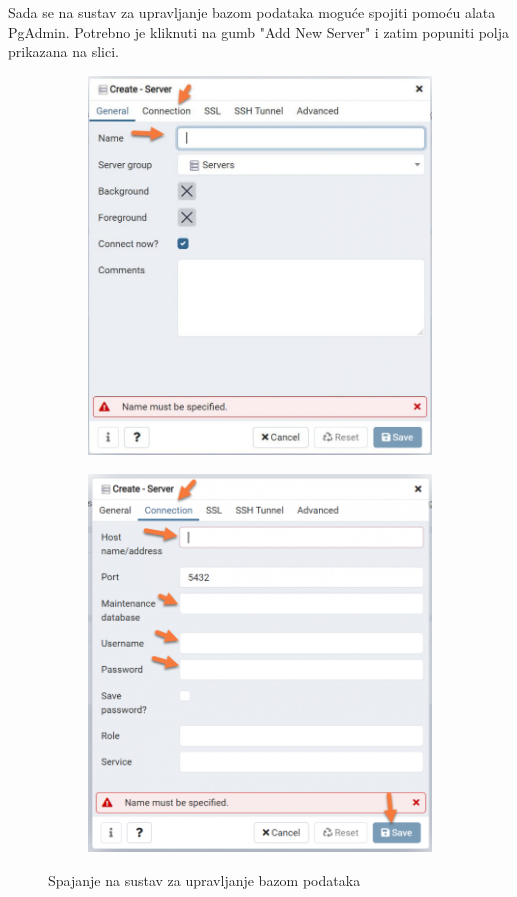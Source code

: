     Sada se na sustav za upravljanje bazom podataka moguće spojiti pomoću alata PgAdmin. Potrebno je kliknuti na gumb "Add New Server" i zatim popuniti polja prikazana na slici.

    \begin{figure}[H]
    \centering
    \begin{subfigure}{.5\textwidth}
      \centering
      \includegraphics[width=0.9\linewidth]{img/2-1-710x783.jpg}
      \label{fig:sub1}
    \end{subfigure}%
    \begin{subfigure}{.5\textwidth}
      \centering
      \includegraphics[width=0.9\linewidth]{img/115-712x783.png}
      \label{fig:sub2}
    \end{subfigure}
    \caption{Spajanje na sustav za upravljanje bazom podataka}
    \label{fig:test}
    \end{figure}

